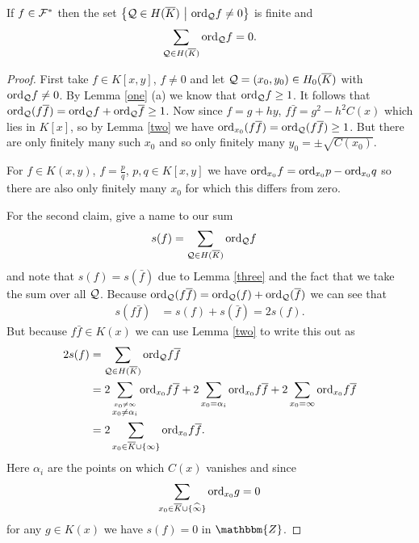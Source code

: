 \documentclass[english,11pt,a4paper]{article}
\begin{document}
\begin{lemma}\label{sform}
  If $f \in \mathcal{F}^*$ then the set $\big \{ \mathcal{Q} \in H(\overline K) \ \big | \ \text{ord}_{\mathcal{Q}} f \neq 0 \big \}$ is finite and 
  \begin{align*}
    \sum_{\q \in \ekb} \ordq f = 0.%
  \end{align*}
  \begin{proof}
    First take $f \in K[x,y]$, $f \neq 0$ and let $\mathcal{Q} = (x_0,y_0) \in H_0(\overline K)$ with $\text{ord}_{\mathcal{Q}} f \neq 0$. By Lemma \ref{one} (a) we know that $\text{ord}_{\mathcal{Q}} f \geq 1$. It follows that $\text{ord}_{\mathcal{Q}} (f \overline f) = \text{ord}_{\mathcal{Q}} f + \text{ord}_{\mathcal{Q}} \overline f \geq 1$. Now since $f = g + h y$, $f \bar f = g^2 - h^2 C(x)$ which lies in $K[x]$, so by Lemma \ref{two} we have $\text{ord}_{x_0} (f \overline f) = \text{ord}_{\mathcal{Q}} (f \overline f) \geq 1$. But there are only finitely many such $x_0$ and so only finitely many $y_0 = \pm \sqrt{C(x_0)}$.

    For $f \in K(x,y)$, $f = \frac p q$, $p, q \in K[x,y]$ we have $\text{ord}_{x_0} f = \text{ord}_{x_0} p - \text{ord}_{x_0} q$ so there are also only finitely many $x_0$ for which this differs from zero.

    For the second claim, give a name to our sum
    \begin{align*}
      s(f) &= \sum_{\mathcal{Q} \in H(\overline K)} \text{ord}_{\mathcal{Q}} f
    \end{align*}
    and note that $s(f) = s(\bar f)$ due to Lemma \ref{three} and the fact that we take the sum over all $\mathcal{Q}$. Because $\text{ord}_{\mathcal{Q}} (f \overline f ) = \text{ord}_{\mathcal{Q}} (f) + \text{ord}_{\mathcal{Q}} ( \overline f )$ we can see that
    \begin{align*}
      s(f \bar f) &= s(f) + s(\bar f) = 2 s(f).
    \end{align*}
    But because $f \bar f \in K(x)$ we can use Lemma \ref{two} to write this out as
    \begin{align*}
      2s(f) &= \sum_{\mathcal{Q} \in H(\overline K)} \text{ord}_{\mathcal{Q}} f \overline f\\
      			&=2 \sum_{\stackrel{x_0 \neq \infty}{x_0 \neq \alpha_i}} \text{ord}_{x_0} f \overline f 
      			+ 2 \sum_{x_0 = \alpha_i} \text{ord}_{x_0} f \overline f 
      			+ 2 \sum_{x_0 = \infty} \text{ord}_{x_0} f \overline f\\
      			&=2 \sum_{x_0 \in \overline K \cup \{ \infty \}} \text{ord}_{x_0} f \overline f.
    \end{align*}
    Here $\alpha_i$ are the points on which $C(x)$ vanishes %
    and since
    \begin{align*}
    	\sum_{x_0 \in \overline K \cup \{ \widehat{\infty} \}} \text{ord}_{x_0} g = 0
    \end{align*}
    for any $g \in K(x)$ we have $s(f) = 0$ in $\mathbbm{Z}$.
  \end{proof}
\end{lemma}
\end{document}
